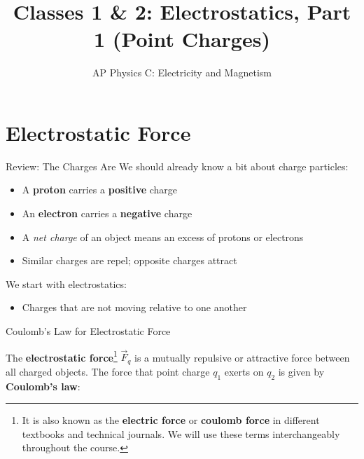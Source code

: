 \documentclass[12pt,aspectratio=169]{beamer}
\title{Classes 1 \& 2: Electrostatics, Part 1 (Point Charges)}
\subtitle{AP Physics C: Electricity and Magnetism}
\begin{document}
\begin{frame}
  \maketitle
\end{frame}


\section{Electrostatic Force}

\begin{frame}{Review: The Charges Are}
  We should already know a bit about charge particles:
  \begin{itemize}
  \item A \textbf{proton} carries a \textbf{positive} charge
  \item An \textbf{electron} carries a \textbf{negative} charge
  \item A \emph{net charge} of an object means an excess of protons or electrons
  \item Similar charges are repel; opposite charges attract
  \end{itemize}

  \vspace{.2in}We start with electrostatics:
  \begin{itemize}
  \item Charges that are not moving relative to one another
  \end{itemize}
\end{frame}



\begin{frame}{Coulomb's Law for Electrostatic Force}
  \begin{center}
  \end{center}
  The \textbf{electrostatic force}\footnote{It is also known as the
  \textbf{electric force} or \textbf{coulomb force} in different textbooks and
  technical journals. We will use these terms interchangeably throughout the
  course.} $\vec F_q$ is a mutually repulsive or attractive force between all
  charged objects. The force that point charge $q_1$ exerts on $q_2$ is given
  by \textbf{Coulomb's law}:

  \vspace{.2in}
  
\end{frame}
\end{document}

